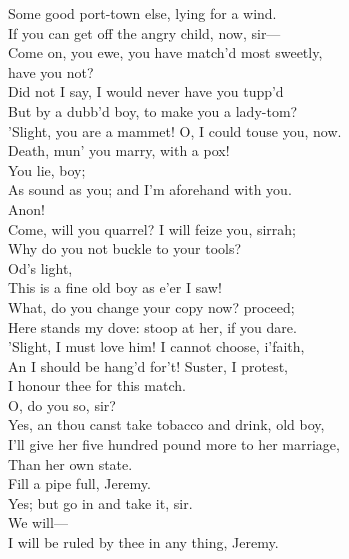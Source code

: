 \documentclass[a4paper,oneside]{memoir}
\begin{document}
\begin{drama*}
Some good port-town else, lying for a wind.\\
If you can get off the angry child, now, sir---\\
\kastrilspeaks Come on, you ewe, you have match'd most sweetly,\\
have you not?\\
Did not I say, I would never have you tupp'd\\
But by a dubb'd boy, to make you a lady-tom?\\
'Slight, you are a mammet! O, I could touse you, now.\\
Death, mun' you marry, with a pox!\\
\lovewitspeaks {} You lie, boy;\\
As sound as you; and I'm aforehand with you.\\
\kastrilspeaks Anon!\\
\lovewitspeaks {} Come, will you quarrel? I will feize you, sirrah;\\
Why do you not buckle to your tools?\\
\kastrilspeaks {} Od's light,\\
This is a fine old boy as e'er I saw!\\
\lovewitspeaks What, do you change your copy now? proceed;\\
Here stands my dove: stoop at her, if you dare.\\
\kastrilspeaks 'Slight, I must love him! I cannot choose, i'faith,\\
An I should be hang'd for't! Suster, I protest,\\
I honour thee for this match.\\
\lovewitspeaks {} O, do you so, sir?\\
\kastrilspeaks Yes, an thou canst take tobacco and drink, old boy,\\
I'll give her five hundred pound more to her marriage,\\
Than her own state.\\
\lovewitspeaks {} Fill a pipe full, Jeremy.\\
\facespeaks Yes; but go in and take it, sir.\\
\lovewitspeaks {} We will---\\
I will be ruled by thee in any thing, Jeremy.\\

\end{drama*}
\end{document}
